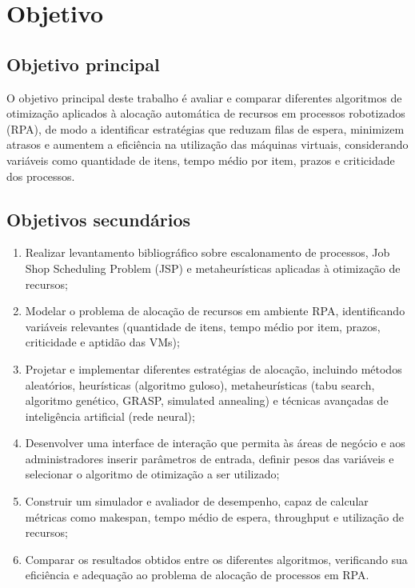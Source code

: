 \documentclass[
    12pt,                %
    openright,           %
    oneside,             %
    a4paper,             %
    english,             %
    brazil               %
]{abntex2}
\begin{document}
\section{Objetivo}
\label{sec:objetivo}

\subsection{Objetivo principal}

O objetivo principal deste trabalho é avaliar e comparar diferentes algoritmos de otimização aplicados à alocação automática de recursos em processos robotizados (RPA), de modo a identificar estratégias que reduzam filas de espera, minimizem atrasos e aumentem a eficiência na utilização das máquinas virtuais, considerando variáveis como quantidade de itens, tempo médio por item, prazos e criticidade dos processos.

\subsection{Objetivos secundários}

\begin{enumerate}
    \item Realizar levantamento bibliográfico sobre escalonamento de processos, Job Shop Scheduling Problem (JSP) e metaheurísticas aplicadas à otimização de recursos;
    \item Modelar o problema de alocação de recursos em ambiente RPA, identificando variáveis relevantes (quantidade de itens, tempo médio por item, prazos, criticidade e aptidão das VMs);
    \item Projetar e implementar diferentes estratégias de alocação, incluindo métodos aleatórios, heurísticas (algoritmo guloso), metaheurísticas (tabu search, algoritmo genético, GRASP, simulated annealing) e técnicas avançadas de inteligência artificial (rede neural);
    \item Desenvolver uma interface de interação que permita às áreas de negócio e aos administradores inserir parâmetros de entrada, definir pesos das variáveis e selecionar o algoritmo de otimização a ser utilizado;
    \item Construir um simulador e avaliador de desempenho, capaz de calcular métricas como makespan, tempo médio de espera, throughput e utilização de recursos;
    \item Comparar os resultados obtidos entre os diferentes algoritmos, verificando sua eficiência e adequação ao problema de alocação de processos em RPA.    
\end{enumerate}
\end{document}
